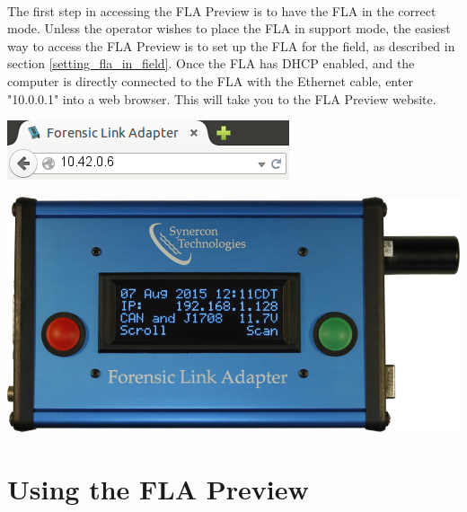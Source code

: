 \documentclass[11pt, oneside]{book}
\begin{document}
\paragraph{  }
The first step in accessing the FLA Preview is to have the FLA in the correct mode. Unless the operator wishes to place the FLA in support mode, the easiest way to access the FLA Preview is to set up the FLA for the field, as described in section \ref{setting_fla_in_field}. Once the FLA has DHCP enabled, and the computer is directly connected to the FLA with the Ethernet cable, enter "10.0.0.1" into a web browser. This will take you to the FLA Preview website.
\\[\baselineskip]
\noindent\begin{minipage}{0.45\textwidth}%
	\includegraphics[width=\linewidth]{../media/fla_preview_screenshots/url_correct_dhcp} 
\end{minipage}%
\hfill%
\begin{minipage}{0.45\textwidth} 
	\includegraphics[width=\linewidth]{../media/fla_screens/ethernet_and_others/main/title_both}
\end{minipage}
\section{Using the FLA Preview}
\end{document}
